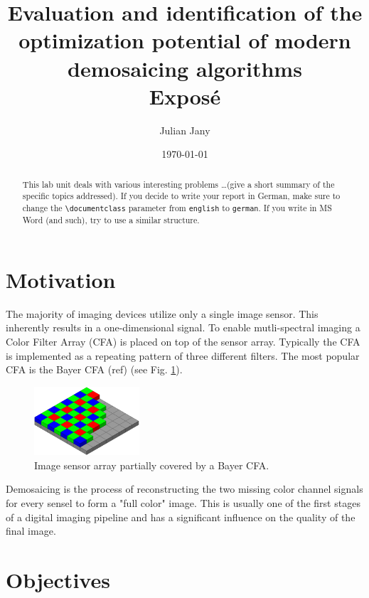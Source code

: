 \documentclass[english,notitlepage,smartquotes]{hgbreport}
\author{Julian Jany}                     %
\title{Evaluation and identification of the optimization potential of modern demosaicing algorithms \\ %
			 Exposé}
\date{\today}
\begin{document}
\maketitle

\begin{abstract}\noindent
This lab unit deals with various interesting problems \ldots (give a short
summary of the specific topics addressed). If you decide to write your report in
German, make sure to change the \verb!\documentclass! parameter from
\texttt{english} to \texttt{german}.
If you write in MS Word (and such), try to use a similar structure.
\end{abstract}


\section{Motivation}

The majority of imaging devices utilize only a single image sensor. This inherently results in a one-dimensional signal. To enable mutli-spectral imaging a Color Filter Array (CFA) is placed on top of the sensor array. Typically the CFA is implemented as a repeating pattern of three different filters. The most popular CFA is the Bayer CFA (ref) (see Fig. \ref{fig:bayer_cfa}).

\begin{figure}[]
	\centering
	\includegraphics[width=0.35\textwidth]{bayer_pattern}
\caption{Image sensor array partially covered by a Bayer CFA. \cite{BayerCFA}}
\label{fig:bayer_cfa}
\end{figure}

Demosaicing is the process of reconstructing the two missing color channel signals for every sensel to form a "full color" image. This is usually one of the first stages of a digital imaging pipeline and has a significant influence on the quality of the final image.

\section{Objectives} %
\end{document}
